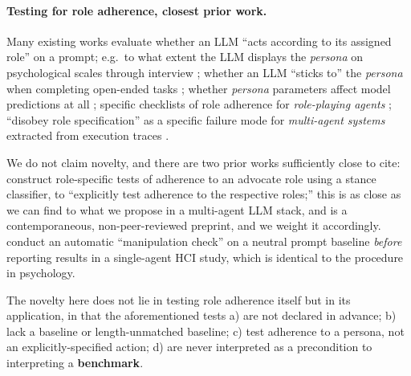 \paragraph{Testing for role adherence, closest prior work.}
Many existing works evaluate whether an LLM ``acts according to its assigned role'' on a prompt;
e.g.\ to what extent the LLM displays the \emph{persona} on psychological scales through interview
\citep{wang2024incharacter}; whether an LLM ``sticks to'' the \emph{persona} when completing
open-ended tasks \citep{shin2025spotting}; whether \emph{persona} parameters affect model
predictions at all \citep{hu2024persona}; specific checklists of role adherence for
\emph{role-playing agents} \citep{rosati2026rpacheck}; ``disobey role specification'' as a specific
failure mode for \emph{multi-agent systems} extracted from execution traces \citep{cemri2025why}.

We do not claim novelty, and there are two prior works sufficiently close to cite:
\citet{dietrich2026roles} construct role-specific tests of adherence to an advocate role using a
stance classifier, to ``explicitly test adherence to the respective roles;'' this is as close as we
can find to what we propose in a multi-agent LLM stack, and is a contemporaneous, non-peer-reviewed
preprint, and we weight it accordingly. \citet{bieberstein2026empathy} conduct an automatic
``manipulation check'' on a neutral prompt baseline \emph{before} reporting results in a
single-agent HCI study, which is identical to the procedure in psychology.

The novelty here does not lie in testing role adherence itself but in its application, in that the
aforementioned tests a) are not declared in advance; b) lack a baseline or length-unmatched
baseline; c) test adherence to a persona, not an explicitly-specified action; d) are never
interpreted as a precondition to interpreting a \textbf{benchmark}.

